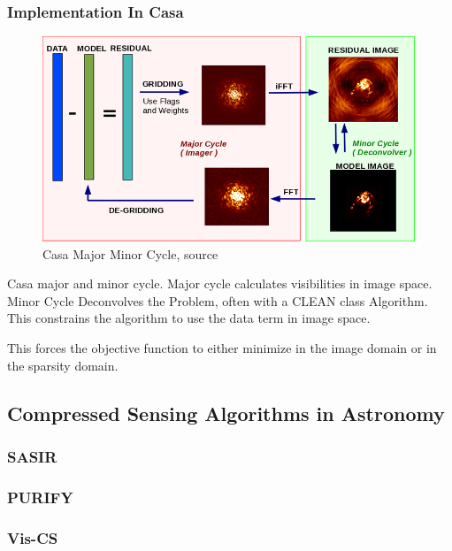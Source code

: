 \subsubsection{Implementation In Casa}
\begin{figure}[h!]
	\centering
	\includegraphics[width=0.6\linewidth]{./chapters/04.cs/img/casa_major_minor.png}
	\caption{Casa Major Minor Cycle, source \cite{casa2018major}}
	\label{cs:major}
\end{figure}

Casa major and minor cycle. Major cycle calculates visibilities in image space. Minor Cycle Deconvolves the Problem, often with a CLEAN class Algorithm. This constrains the algorithm to use the data term in image space. 

This forces the objective function to either minimize in the image domain or in the sparsity domain.


\subsection{Compressed Sensing Algorithms in Astronomy}

\subsubsection{SASIR}

\subsubsection{PURIFY}

\subsubsection{Vis-CS}


 
